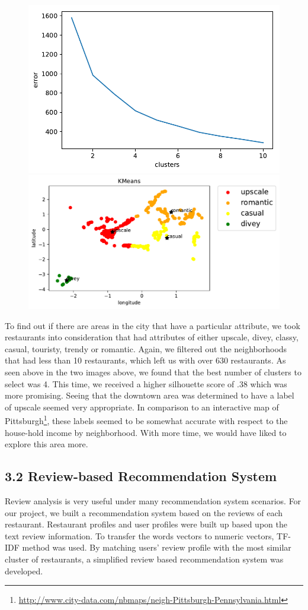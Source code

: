 \documentclass{neu_handout}
\begin{document}
\begin{figure}[h]
\centering
{
\includegraphics[width=0.38\linewidth]{error_kmeans_attributes}
}
{
\includegraphics[width=0.5\linewidth]{kmeans_attributes}
}
\end{figure}


To find out if there are areas in the city that have a particular attribute, we took restaurants into consideration that had attributes of either upscale, divey, classy, casual, touristy, trendy or romantic. Again, we filtered out the neighborhoods that had less than 10 restaurants, which left us with over 630 restaurants. As seen above in the two images above, we found that the best number of clusters to select was 4. This time, we received a higher silhouette score of .38 which was more promising. Seeing that the downtown area was determined to have a label of upscale seemed very appropriate. In comparison to an interactive map of Pittsburgh\footnote{\url{http://www.city-data.com/nbmaps/neigh-Pittsburgh-Pennsylvania.html}}, these labels seemed to be somewhat accurate with respect to the house-hold income by neighborhood. With more time, we would have liked to explore this area more.




\subsection*{3.2 Review-based Recommendation System}
Review analysis is very useful under many recommendation system scenarios. For our project, we built a recommendation system based on the reviews of each restaurant. Restaurant profiles and user profiles were built up based upon the text review information. To transfer the words vectors to numeric vectors, TF-IDF method was used. By matching users’ review profile with the most similar cluster of restaurants, a simplified review based recommendation system was developed.
\end{document}

